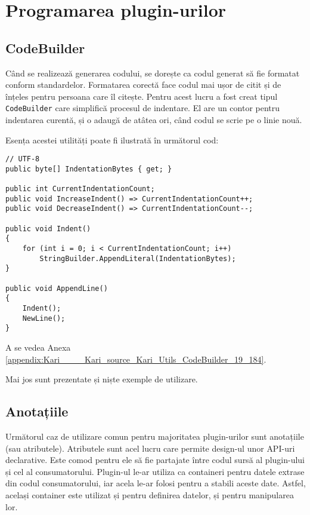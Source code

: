 \documentclass[a4paper,12pt]{report}
\begin{document}
\section{Programarea plugin-urilor}

\subsection{CodeBuilder}

Când se realizează generarea codului, se dorește ca codul generat să fie formatat conform standardelor.
Formatarea corectă face codul mai ușor de citit și de înțeles pentru persoana care îl citește.
Pentru acest lucru a fost creat tipul \texttt{CodeBuilder} care simplifică procesul de indentare.
El are un contor pentru indentarea curentă, și o adaugă de atâtea ori, când codul se scrie pe o linie nouă.

Esența acestei utilități poate fi ilustrată în următorul cod:

\begin{verbatim}
// UTF-8
public byte[] IndentationBytes { get; }

public int CurrentIndentationCount;
public void IncreaseIndent() => CurrentIndentationCount++;
public void DecreaseIndent() => CurrentIndentationCount--;

public void Indent()
{
    for (int i = 0; i < CurrentIndentationCount; i++)
        StringBuilder.AppendLiteral(IndentationBytes);
}

public void AppendLine()
{
    Indent();
    NewLine();
}
\end{verbatim}

A se vedea Anexa \ref{appendix:Kari____Kari_source_Kari_Utils_CodeBuilder_19_184}.

Mai jos sunt prezentate și niște exemple de utilizare.

\subsection{Anotațiile}

Următorul caz de utilizare comun pentru majoritatea plugin-urilor sunt anotațiile (sau atributele).
Atributele sunt acel lucru care permite design-ul unor \ac{API}-uri declarative.
Este comod pentru ele să fie partajate între codul sursă al plugin-ului și cel al consumatorului.
Plugin-ul le-ar utiliza ca containeri pentru datele extrase din codul consumatorului, iar acela le-ar folosi pentru a stabili aceste date.
Astfel, același container este utilizat și pentru definirea datelor, și pentru manipularea lor.
\end{document}
